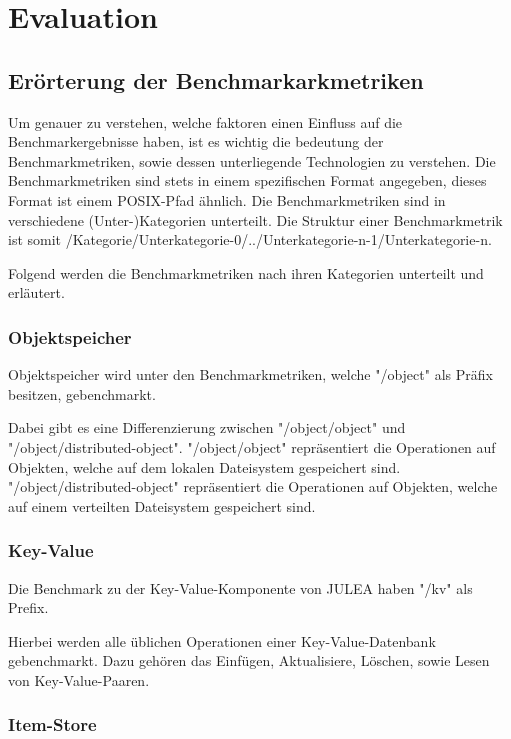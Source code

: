 \chapter{Evaluation}

\section{Erörterung der Benchmarkarkmetriken}

Um genauer zu verstehen, welche faktoren einen Einfluss auf die Benchmarkergebnisse haben, ist es wichtig die bedeutung der Benchmarkmetriken, sowie dessen unterliegende Technologien zu verstehen. Die Benchmarkmetriken sind stets in einem spezifischen Format angegeben, dieses Format ist einem POSIX-Pfad ähnlich. Die Benchmarkmetriken sind in verschiedene (Unter-)Kategorien unterteilt. Die Struktur einer Benchmarkmetrik ist somit /Kategorie/Unterkategorie-0/../Unterkategorie-n-1/Unterkategorie-n.

Folgend werden die Benchmarkmetriken nach ihren Kategorien unterteilt und erläutert.

\subsection{Objektspeicher}

Objektspeicher wird unter den Benchmarkmetriken, welche "/object" als Präfix besitzen, gebenchmarkt.

Dabei gibt es eine Differenzierung zwischen "/object/object" und "/object/distributed-object". "/object/object" repräsentiert die Operationen auf Objekten, welche auf dem lokalen Dateisystem gespeichert sind. "/object/distributed-object" repräsentiert die Operationen auf Objekten, welche auf einem verteilten Dateisystem gespeichert sind. 

\subsection{Key-Value}

Die Benchmark zu der Key-Value-Komponente von JULEA haben "/kv" als Prefix. 

Hierbei werden alle üblichen Operationen einer Key-Value-Datenbank gebenchmarkt. Dazu gehören das Einfügen, Aktualisiere, Löschen, sowie Lesen von Key-Value-Paaren.

\subsection{Item-Store}

